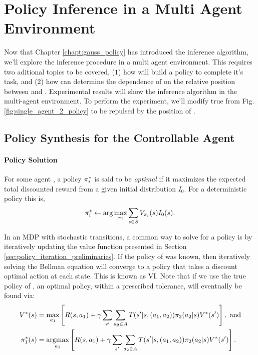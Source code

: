 \chapter{Policy Inference in a Multi Agent Environment}\label{chapt:multi_agent}

Now that Chapter \ref{chapt:gauss_policy} has introduced the inference algorithm, we'll explore the inference procedure
in a multi agent environment. This requires two aditional topics to be covered, ($1$) how  will build a policy
to complete it's task, and ($2$) how  can determine the dependence of  on the relative position
between  and .  Experimental results will show the inference algorithm in the multi-agent environment.
To perform the experiment, we'll modify true  from Fig. \ref{fig:single_agent_2_policy} to be repulsed by the
position of .

\section{Policy Synthesis for the Controllable Agent}\label{sec:preliminaries}




\subsubsection{Policy Solution}
    For some agent , a policy $\pi_{i}^*$ is said to be \textit{optimal} if it maximizes the
    expected total discounted reward from a given initial distribution $I_0$. For a deterministic policy this is,
    \begin{equation}\label{eq:policy_hard_max}
        \pi_{i}^* \leftarrow \arg\max_{\pi_{i}}\sum_{s\in S} V_{\pi_{i}}(s)I_0(s) .
    \end{equation}

    In an \ac{MDP} with stochastic transitions, a common way to solve for a policy is by iteratively updating the value
    function presented in Section \ref{sec:policy_iteration_preliminaries}. If the policy of  was known, then
    iteratively solving the Bellman equation \cite{hernandez2012adaptive} will converge to a policy that takes a
    discount optimal action at each state. This is known as \acf{VI}. Note that if we use the true policy of ,
    an optimal policy, within a prescribed tolerance, will eventually be found via:
    \begin{equation}\label{eq:bellman_true}
        \begin{aligned}
                V^*(s) &= \max_{a_1}\left[R(s,a_1) +
                    \gamma\sum_{s'}\sum_{a_2\in A}T(s'|s,(a_1,a_2))\pi_{2}(a_2|s) V^*(s')\right],\ \text{and}\\
                \pi_{1}^*(s) &= \mathop{\mathrm{argmax}}_{a_1}\left[R(s,a_1) +
                    \gamma\sum_{s'}\sum_{a_2\in A}T(s'|s,(a_1,a_2))\pi_{2}(a_2|s)V^*(s')\right].
        \end{aligned}
    \end{equation}

